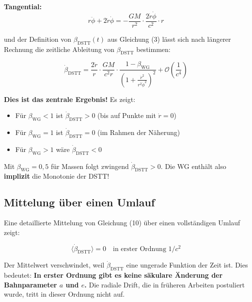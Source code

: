 \documentclass[12pt,a4paper]{article}
\begin{document}
\textbf{Tangential:}
\begin{equation}
r\ddot{\phi} + 2\dot{r}\dot{\phi} = -\frac{GM}{r^2} \cdot \frac{2\dot{r}\dot{\phi}}{c^2} \cdot r
\end{equation}

und der Definition von \(\beta_{\text{DSTT}}(t)\) aus Gleichung (3) lässt sich nach längerer Rechnung die zeitliche Ableitung von \(\beta_{\text{DSTT}}\) bestimmen:

\begin{equation}
\dot{\beta}_{\text{DSTT}} = \frac{2\dot{r}}{r} \cdot \frac{GM}{c^2 r} \cdot \frac{1 - \beta_{\text{WG}}}{\left(1 + \frac{\dot{r}^2}{r^2\dot{\phi}^2}\right)^2} + \mathcal{O}\left(\frac{1}{c^4}\right)
\end{equation}

\textbf{Dies ist das zentrale Ergebnis!} Es zeigt:

\begin{itemize}
    \item Für \(\beta_{\text{WG}} < 1\) ist \(\dot{\beta}_{\text{DSTT}} > 0\) (bis auf Punkte mit \(\dot{r} = 0\))
    \item Für \(\beta_{\text{WG}} = 1\) ist \(\dot{\beta}_{\text{DSTT}} = 0\) (im Rahmen der Näherung)
    \item Für \(\beta_{\text{WG}} > 1\) wäre \(\dot{\beta}_{\text{DSTT}} < 0\)
\end{itemize}

Mit \(\beta_{\text{WG}} = 0,5\) für Massen folgt zwingend \(\dot{\beta}_{\text{DSTT}} > 0\). Die WG enthält also \textbf{implizit} die Monotonie der DSTT!

\subsection{Mittelung über einen Umlauf}

Eine detaillierte Mittelung von Gleichung (10) über einen vollständigen Umlauf zeigt:

\begin{equation}
\langle \dot{\beta}_{\text{DSTT}} \rangle = 0 \quad \text{in erster Ordnung } 1/c^2
\end{equation}

Der Mittelwert verschwindet, weil \(\dot{\beta}_{\text{DSTT}}\) eine ungerade Funktion der Zeit ist. Dies bedeutet:  
\textbf{In erster Ordnung gibt es keine säkulare Änderung der Bahnparameter \(a\) und \(e\).}  
Die radiale Drift, die in früheren Arbeiten postuliert wurde, tritt in dieser Ordnung nicht auf.
\end{document}
